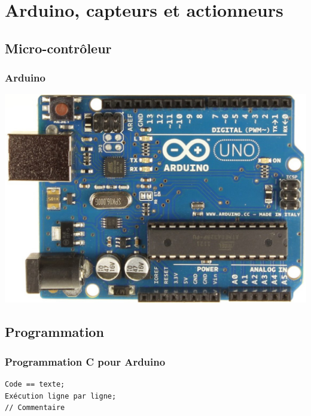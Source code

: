 \documentclass[aspectratio=169,utf8,french]{beamer}
\begin{document}
\section{Arduino, capteurs et actionneurs}

\begin{frame}
  \tableofcontents[currentsection]
\end{frame}

\subsection{Micro-contrôleur}

\begin{frame}
  \frametitle{Arduino}
  \begin{center}
    \includegraphics[height=.8\textheight]{pictures/arduino.jpg}
  \end{center}
\end{frame}

\subsection{Programmation}

\begin{frame}[fragile]
  \frametitle{Programmation C pour Arduino}
  \begin{lstlisting}
Code == texte;
Exécution ligne par ligne;
// Commentaire
  \end{lstlisting}
\end{frame}
\end{document}
